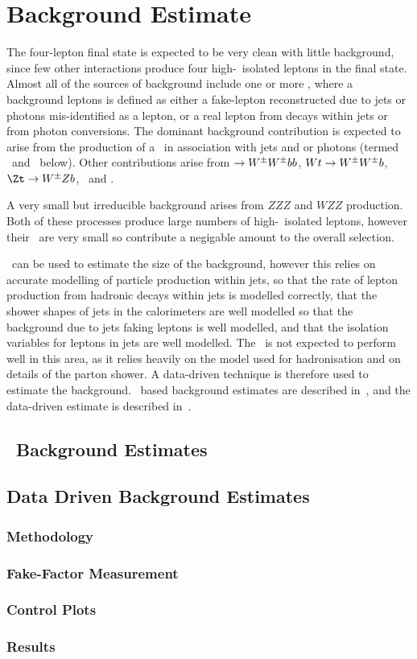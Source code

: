 \graphicspath{{Chapters/BackgroundEstimate/Figures/}}
\chapter{Background Estimate}
\label{chap:BackgroundEstimate}

The four-lepton final state is expected to be very clean with little
background, since few other interactions produce four high-\pt\ isolated leptons
in the final state. Almost all of the sources of background include one or more
, where a background
leptons is defined as either a fake-lepton reconstructed due to jets or
photons mis-identified as a lepton, or a real lepton from decays within jets or
from photon conversions.
The dominant background contribution is expected to arise from the production of a \Z\ in
association with jets and or photons (termed \Zjets\ and \Zgamma\ below). Other
contributions arise from \ttbar$\rightarrow W^{\pm}W^{\pm} bb$, $Wt\rightarrow W^{\pm}W^{\pm} b$, $\Zt\ra\W\Z b$,
\WW\ and \WZ.

A very small but irreducible background arises from $ZZZ$ and $WZZ$ production.
Both of these processes produce large numbers of high-\pt\ isolated leptons,
however their \cx\ are very small so contribute a negigable amount to the
overall selection.

\mcsim\ can be used to estimate the size of the background, however this relies
on accurate modelling of particle production within jets, so that the rate of
lepton production from hadronic decays within jets is modelled correctly, 
that the shower shapes of jets in the calorimeters are well modelled so that the
background due to jets faking leptons is well modelled, and that the isolation
variables for leptons in jets are well modelled. The \mc\ is not expected to
perform well in this area, as it relies heavily on the model used for
hadronisation and on details of the parton shower. A data-driven technique is
therefore used to estimate the background. \mc\ based background estimates are
described in~, and the data-driven estimate is described in~.

\section{\mc\ Background Estimates}
\label{sec:mcbg}


\section{Data Driven Background Estimates}
\label{sec:ddbg}
\subsection{Methodology}
\subsection{Fake-Factor Measurement}
\subsection{Control Plots}
\subsection{Results}

